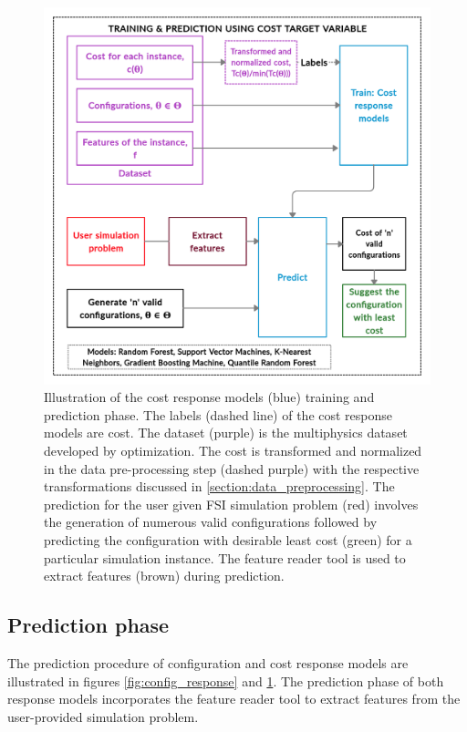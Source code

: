 \begin{figure}[!ht]
\centering
\includegraphics[width=0.9\linewidth,height=0.6\textheight]{images/cost_response.jpg}
\captionsetup{justification=justified}
\caption[Cost response model training and prediction phase]{Illustration of the cost response models (blue) training and prediction phase. The labels (dashed line) of the cost response models are cost. The dataset (purple) is the multiphysics dataset developed by optimization. The cost is transformed and normalized in the data pre-processing step (dashed purple) with the respective transformations discussed in \ref{section:data_preprocessing}. The prediction for the user given FSI simulation problem (red) involves the generation of numerous valid configurations followed by predicting the configuration with desirable least cost (green) for a particular simulation instance. The feature reader tool is used to extract features (brown) during prediction.}
\label{fig:cost_response}
\end{figure}

\subsection{Prediction phase}
\label{section:prediction_phase}

The prediction procedure of configuration and cost response models are illustrated in figures \ref{fig:config_response} and \ref{fig:cost_response}. The prediction phase of both response models incorporates the feature reader tool to extract features from the user-provided simulation problem.

